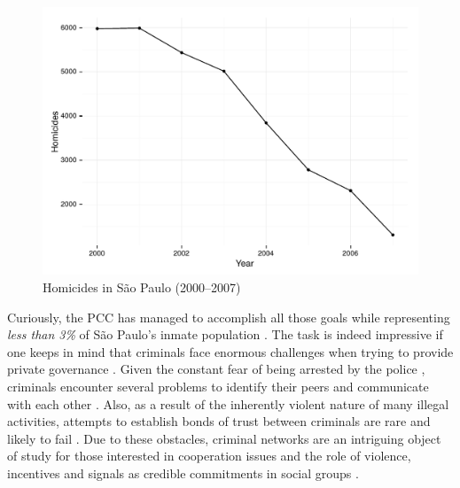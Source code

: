 \begin{center}
\begin{figure}[bth!]
\includegraphics[height = 8cm, width = 1\linewidth]{gfx/fig3}
\caption[Homicides in S\~{a}o Paulo (2000--2007)]{Homicides in S\~{a}o Paulo (2000--2007)\footnotemark}
\label{fig:fig3}
\end{figure}
\end{center}


Curiously, the PCC has managed to accomplish all those goals while representing \textit{less than 3\%} of S\~{a}o Paulo's inmate population \citep[]{bbc2013pcc, veja2013crescimentopcc}. The task is indeed impressive if one keeps in mind that criminals face enormous challenges when trying to provide private governance \citep{sheptycki2003governance}. Given the constant fear of being arrested by the police \citep{williams2002cooperation}, criminals encounter several problems to identify their peers and communicate with each other \citep[xii]{gambetta2009codes}. Also, as a result of the inherently violent nature of many illegal activities, attempts to establish bonds of trust between criminals are rare and likely to fail \citep{liebling2012social, von2004organized}. Due to these obstacles, criminal networks are an intriguing object of study for those interested in cooperation issues and the role of violence, incentives and signals as credible commitments in social groups \citep{campana2013cooperation, densley2012street, freeman1994crime}.

